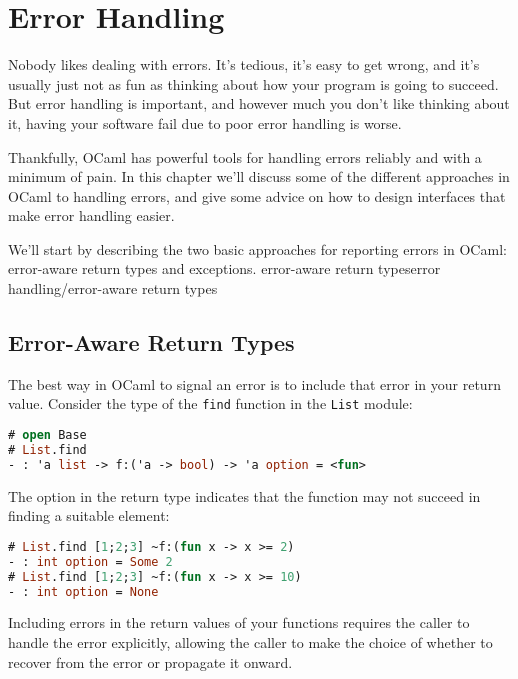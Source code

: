 \hypertarget{error-handling}{%
\section{Error Handling}\label{error-handling}}

Nobody likes dealing with errors. It's tedious, it's easy to get wrong,
and it's usually just not as fun as thinking about how your program is
going to succeed. But error handling is important, and however much you
don't like thinking about it, having your software fail due to poor
error handling is worse.

Thankfully, OCaml has powerful tools for handling errors reliably and
with a minimum of pain. In this chapter we'll discuss some of the
different approaches in OCaml to handling errors, and give some advice
on how to design interfaces that make error handling easier.

We'll start by describing the two basic approaches for reporting errors
in OCaml: error-aware return types and exceptions.
\protect\hypertarget{erraware}{}{error-aware return
types}\protect\hypertarget{EHeraware}{}{error handling/error-aware
return types}

\hypertarget{error-aware-return-types}{%
\subsection{Error-Aware Return Types}\label{error-aware-return-types}}

The best way in OCaml to signal an error is to include that error in
your return value. Consider the type of the
\passthrough{\lstinline!find!} function in the
\passthrough{\lstinline!List!} module:

\begin{lstlisting}[language=Caml]
# open Base
# List.find
- : 'a list -> f:('a -> bool) -> 'a option = <fun>
\end{lstlisting}

The option in the return type indicates that the function may not
succeed in finding a suitable element:

\begin{lstlisting}[language=Caml]
# List.find [1;2;3] ~f:(fun x -> x >= 2)
- : int option = Some 2
# List.find [1;2;3] ~f:(fun x -> x >= 10)
- : int option = None
\end{lstlisting}

Including errors in the return values of your functions requires the
caller to handle the error explicitly, allowing the caller to make the
choice of whether to recover from the error or propagate it onward.

